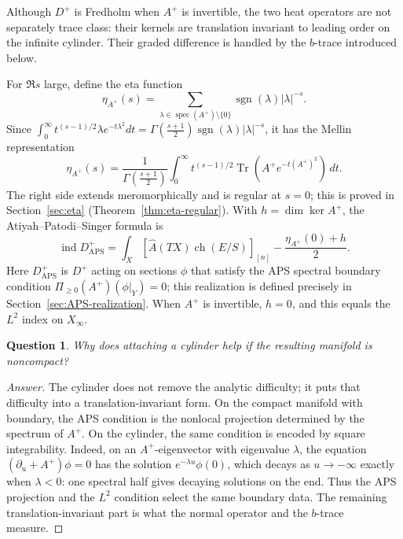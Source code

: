 \documentclass[12pt,oneside,reqno]{article}
\DeclareMathOperator{\Tr}{Tr}
\theoremstyle{plain}
\newtheorem{question}[theorem]{Question}
\theoremstyle{definition}
\theoremstyle{remark}
\newenvironment{answer}{\begin{proof}[Answer]}{\end{proof}}
\begin{document}
Although $D^+$ is Fredholm when $A^+$ is invertible, the two heat
operators are not separately trace class: their kernels are
translation invariant to leading order on the infinite cylinder. Their
graded difference is handled by the $b$-trace introduced below.

For $\Re s$ large, define the eta function
\begin{equation}\label{eq:eta-def}
 \eta_{A^+}(s)=\sum_{\lambda\in\operatorname{spec}(A^+)\setminus\{0\}}
   \operatorname{sgn}(\lambda)|\lambda|^{-s}.
\end{equation}
Since \(\int_0^\infty t^{(s-1)/2}\lambda e^{-t\lambda^2}dt
=\Gamma(\tfrac{s+1}2)\operatorname{sgn}(\lambda)|\lambda|^{-s}\), it has the
Mellin representation
\begin{equation}\label{eq:eta-mellin}
 \eta_{A^+}(s)=\frac{1}{\Gamma\!\left(\frac{s+1}{2}\right)}
 \int_0^\infty t^{(s-1)/2}\Tr(A^+e^{-t(A^+)^2})\,dt.
\end{equation}
The right side extends meromorphically and is regular at $s=0$; this is
proved in Section~\ref{sec:eta} (Theorem~\ref{thm:eta-regular}). With
$h=\dim\ker A^+$, the Atiyah--Patodi--Singer formula \cite{APS} is
\[
 \operatorname{ind}D_{\mathrm{APS}}^+
 =\int_X
  \left[\widehat A(TX)\operatorname{ch}(E/S)\right]_{[n]}
  -\frac{\eta_{A^+}(0)+h}{2}.
\]
Here \(D^+_{\mathrm{APS}}\) is \(D^+\) acting on sections \(\phi\) that
satisfy the APS spectral boundary condition
\(\Pi_{\geq0}(A^+)(\phi|_Y)=0\); this realization is defined precisely in
Section~\ref{sec:APS-realization}.
When $A^+$ is invertible, $h=0$, and this equals the $L^2$ index on
$X_\infty$.

\begin{question}
Why does attaching a cylinder help if the resulting manifold is
noncompact?
\end{question}

\begin{answer}
The cylinder does not remove the analytic difficulty; it puts that
difficulty into a translation-invariant form. On the compact manifold
with boundary, the APS condition is the nonlocal projection determined by
the spectrum of \(A^+\). On the cylinder, the same condition is encoded by
square integrability. Indeed, on an \(A^+\)-eigenvector with eigenvalue
\(\lambda\), the equation \((\partial_u+A^+)\phi=0\) has the solution
\(e^{-\lambda u}\phi(0)\), which decays as \(u\to-\infty\) exactly when
\(\lambda<0\): one spectral half gives decaying solutions on the end.
Thus the APS projection and the \(L^2\) condition select the same boundary
data. The remaining translation-invariant part is what the normal operator
and the \(b\)-trace measure.
\end{answer}
\end{document}

